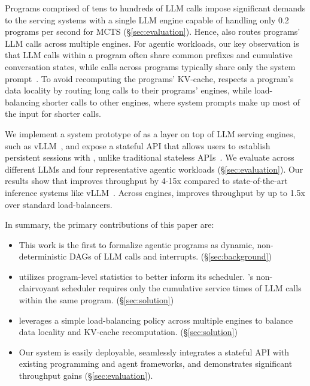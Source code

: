Programs comprised of tens to hundreds of LLM calls impose significant demands to the serving systems with a single LLM engine capable of handling only 0.2 programs per second for MCTS (\S\ref{sec:evaluation}). Hence, \text{\name} also routes programs' LLM calls across multiple engines. For agentic workloads, our key observation is that LLM calls within a program often share common prefixes and cumulative conversation states, while calls across programs typically share only the system prompt~\cite{preble}. To avoid recomputing the programs' KV-cache, \text{\name} respects a program's data locality by routing long calls to their programs' engines, while load-balancing shorter calls to other engines, where system prompts make up most of the input for shorter calls.

We implement a system prototype of \text{\name} as a layer on top of LLM serving engines, such as vLLM~\cite{vllm}, and expose a stateful API that allows users to establish persistent sessions with \text{\name}, unlike traditional stateless APIs~\cite{openai_chat_api}. We evaluate \text{\name} across different LLMs and four representative agentic workloads (\S\ref{sec:evaluation}). Our results show that \text{\name} improves throughput by 4-15x compared to state-of-the-art inference systems like vLLM~\cite{vllm}. Across engines, \text{\name} improves throughput by up to 1.5x over standard load-balancers.

\noindent In summary, the primary contributions of this paper are:
\begin{itemize}[itemsep=0pt, parsep=0pt, topsep=0pt, partopsep=0pt, leftmargin=*]
  \item This work is the first to formalize agentic programs as dynamic, non-deterministic DAGs of LLM calls and interrupts. (\S\ref{sec:background}) 
  \item \text{\name} utilizes program-level statistics to better inform its scheduler. \text{\name}'s non-clairvoyant scheduler requires only the cumulative service times of LLM calls within the same program. (\S\ref{sec:solution})
  \item \text{\name} leverages a simple load-balancing policy across multiple engines to balance data locality and KV-cache recomputation. (\S\ref{sec:solution})
  \item Our system is easily deployable, seamlessly integrates a stateful API with existing programming and agent frameworks, and  demonstrates significant throughput gains (\S\ref{sec:evaluation}).
\end{itemize}

